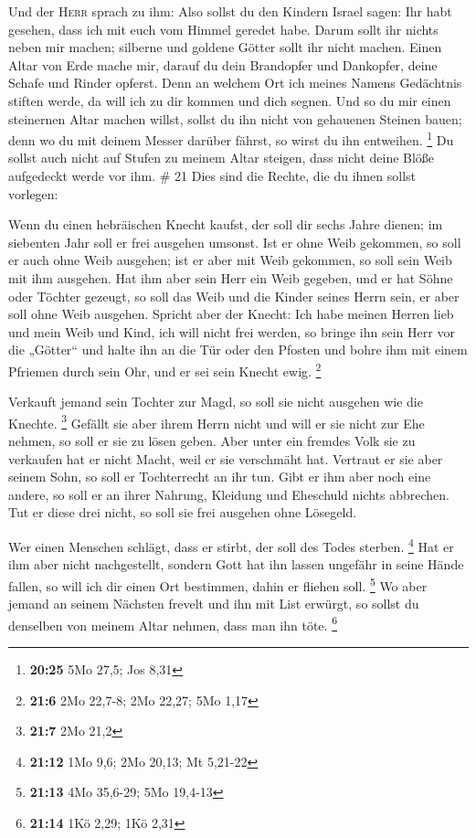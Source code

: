  Und der \textsc{Herr} sprach zu ihm: Also sollst du den
Kindern Israel sagen: Ihr habt gesehen, dass ich mit euch vom Himmel
geredet habe.  Darum sollt ihr nichts neben mir machen;
silberne und goldene Götter sollt ihr nicht machen. 
Einen Altar von Erde mache mir, darauf du dein Brandopfer und Dankopfer,
deine Schafe und Rinder opferst. Denn an welchem Ort ich meines Namens
Gedächtnis stiften werde, da will ich zu dir kommen und dich segnen.
 Und so du mir einen steinernen Altar machen willst,
sollst du ihn nicht von gehauenen Steinen bauen; denn wo du mit deinem
Messer darüber fährst, so wirst du ihn entweihen. \footnote{\textbf{20:25}
  5Mo 27,5; Jos 8,31}  Du sollst auch nicht auf Stufen zu
meinem Altar steigen, dass nicht deine Blöße aufgedeckt werde vor ihm.
\# 21  Dies sind die Rechte, die du ihnen sollst vorlegen:

 Wenn du einen hebräischen Knecht kaufst, der soll dir
sechs Jahre dienen; im siebenten Jahr soll er frei ausgehen umsonst.
 Ist er ohne Weib gekommen, so soll er auch ohne Weib
ausgehen; ist er aber mit Weib gekommen, so soll sein Weib mit ihm
ausgehen.  Hat ihm aber sein Herr ein Weib gegeben, und er
hat Söhne oder Töchter gezeugt, so soll das Weib und die Kinder seines
Herrn sein, er aber soll ohne Weib ausgehen.  Spricht aber
der Knecht: Ich habe meinen Herren lieb und mein Weib und Kind, ich will
nicht frei werden,  so bringe ihn sein Herr vor die
„Götter`` und halte ihn an die Tür oder den Pfosten und bohre ihm mit
einem Pfriemen durch sein Ohr, und er sei sein Knecht ewig. \footnote{\textbf{21:6}
  2Mo 22,7-8; 2Mo 22,27; 5Mo 1,17}

 Verkauft jemand sein Tochter zur Magd, so soll sie nicht
ausgehen wie die Knechte. \footnote{\textbf{21:7} 2Mo 21,2}
 Gefällt sie aber ihrem Herrn nicht und will er sie nicht
zur Ehe nehmen, so soll er sie zu lösen geben. Aber unter ein fremdes
Volk sie zu verkaufen hat er nicht Macht, weil er sie verschmäht hat.
 Vertraut er sie aber seinem Sohn, so soll er Tochterrecht
an ihr tun.  Gibt er ihm aber noch eine andere, so soll
er an ihrer Nahrung, Kleidung und Eheschuld nichts abbrechen.
 Tut er diese drei nicht, so soll sie frei ausgehen ohne
Lösegeld.

 Wer einen Menschen schlägt, dass er stirbt, der soll des
Todes sterben. \footnote{\textbf{21:12} 1Mo 9,6; 2Mo 20,13; Mt 5,21-22}
 Hat er ihm aber nicht nachgestellt, sondern Gott hat ihn
lassen ungefähr in seine Hände fallen, so will ich dir einen Ort
bestimmen, dahin er fliehen soll. \footnote{\textbf{21:13} 4Mo 35,6-29;
  5Mo 19,4-13}  Wo aber jemand an seinem Nächsten frevelt
und ihn mit List erwürgt, so sollst du denselben von meinem Altar
nehmen, dass man ihn töte. \footnote{\textbf{21:14} 1Kö 2,29; 1Kö 2,31}

